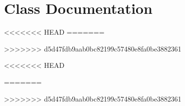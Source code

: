 \let\mypdfximage\pdfximage\def\pdfximage{\immediate\mypdfximage}\documentclass[twoside]{book}
\newcommand{\+}{\discretionary{\mbox{\scriptsize$\hookleftarrow$}}{}{}}
\begin{document}
\chapter{Class Documentation}



<<<<<<< HEAD
=======







>>>>>>> d5d47fdb9aab0bc82199c57480e8fa0be3882361















<<<<<<< HEAD



=======








>>>>>>> d5d47fdb9aab0bc82199c57480e8fa0be3882361



\end{document}
